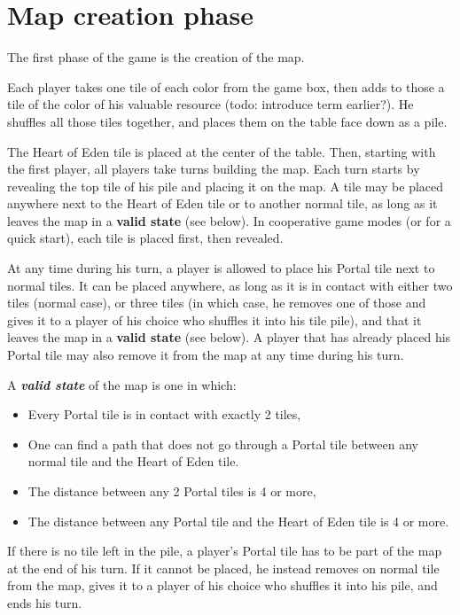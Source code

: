 \documentclass[a4paper]{article}
\begin{document}
\section{Map creation phase}

    The first phase of the game is the creation of the map.
    
    Each player takes one tile of each color from the game box,
    then adds to those a tile of the color of his valuable resource
    (todo: introduce term earlier?).
    He shuffles all those tiles together,
    and places them on the table face down as a pile.
    
    The Heart of Eden tile is placed at the center of the table.
    Then, starting with the first player, all players take turns building the map.
    Each turn starts by revealing the top tile of his pile and placing it on the map.
    A tile may be placed anywhere next to the Heart of Eden tile or to another normal
    tile, as long as it leaves the map in a \textbf{valid state} (see below).
    In cooperative game modes (or for a quick start), each tile is placed first,
    then revealed.
    
    At any time during his turn, a player is allowed to place his Portal tile
    next to normal tiles.
    It can be placed anywhere, as long as it is in contact with either two tiles
    (normal case), or three tiles (in which case, he removes one of those and gives
    it to a player of his choice who shuffles it into his tile pile),
    and that it leaves the map in a \textbf{valid state} (see below).
    A player that has already placed his Portal tile may also remove it from the map at
    any time during his turn.    
    
    A \textbf{\textit{valid state}} of the map is one in which:
    \vspace{-1.3em}
    \begin{itemize}
        \item Every Portal tile is in contact with exactly 2 tiles,
        \item One can find a path that does not go through a Portal tile between
        any normal tile and the Heart of Eden tile.
        \item The distance between any 2 Portal tiles is 4 or more,
        \item The distance between any Portal tile and the Heart of Eden tile
        is 4 or more.
    \end{itemize}
    
    \vspace{-0.7em}
    If there is no tile left in the pile, a player's Portal tile has to be part of the
    map at the end of his turn.
    If it cannot be placed, he instead removes on normal tile from the map, gives
    it to a player of his choice who shuffles it into his pile, and ends his turn.
    
\end{document}

